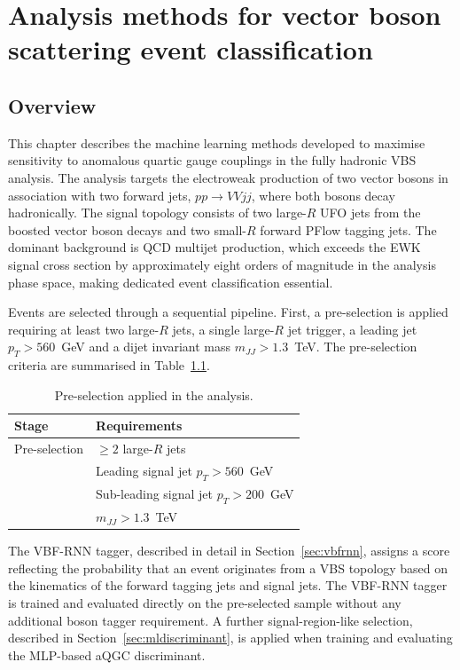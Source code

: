 \chapter{Analysis methods for vector boson scattering event classification}
\label{chap:mlmethods}

\section{Overview}

This chapter describes the machine learning methods developed to maximise sensitivity to anomalous quartic gauge couplings in the fully hadronic VBS analysis. The analysis targets the electroweak production of two vector bosons in association with two forward jets, $pp \to VVjj$, where both bosons decay hadronically. The signal topology consists of two large-$R$ UFO jets from the boosted vector boson decays and two small-$R$ forward PFlow tagging jets. The dominant background is QCD multijet production, which exceeds the EWK signal cross section by approximately eight orders of magnitude in the analysis phase space, making dedicated event classification essential.

Events are selected through a sequential pipeline. First, a pre-selection is applied requiring at least two large-$R$ jets, a single large-$R$ jet trigger, a leading jet $p_T > 560$~GeV and a dijet invariant mass $m_{JJ} > 1.3$~TeV. The pre-selection criteria are summarised in Table~\ref{tab:analysis_selection}.

\begin{table}[h]
\centering
\caption{Pre-selection applied in the analysis.}
\label{tab:analysis_selection}
\begin{tabular}{ll}
\toprule
Stage & Requirements \\
\midrule
Pre-selection
& $\geq 2$ large-$R$ jets \\
& Leading signal jet $p_T > 560$~GeV \\
& Sub-leading signal jet $p_T > 200$~GeV \\
& $m_{JJ} > 1.3$~TeV \\
\bottomrule
\end{tabular}
\end{table}

The VBF-RNN tagger, described in detail in Section~\ref{sec:vbfrnn}, assigns a score reflecting the probability that an event originates from a VBS topology based on the kinematics of the forward tagging jets and signal jets. The VBF-RNN tagger is trained and evaluated directly on the pre-selected sample without any additional boson tagger requirement. A further signal-region-like selection, described in Section~\ref{sec:mldiscriminant}, is applied when training and evaluating the MLP-based aQGC discriminant.

